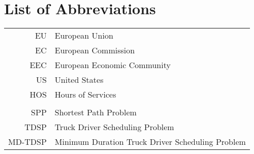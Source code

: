 

\appendix

{}	%
{}	%

\section{List of Abbreviations\label{app:abb}}

\begin{tabular}{rp{}}
	EU            & European Union                                                                                                               \\
	EC            & European Commission                                                                                                          \\
	EEC           & European Economic Community                                                                                                  \\
	US            & United States                                                                                                                \\
	HOS           & Hours of Services                                                                                                            \\
	\vspace{2\baselineskip}                                                                                                                      \\
	SPP           & Shortest Path Problem                                                                                                        \\
	TDSP          & Truck Driver Scheduling Problem                                                                                              \\
	MD-TDSP       & Minimum Duration Truck Driver Scheduling Problem                                                                             \\

\end{tabular}
